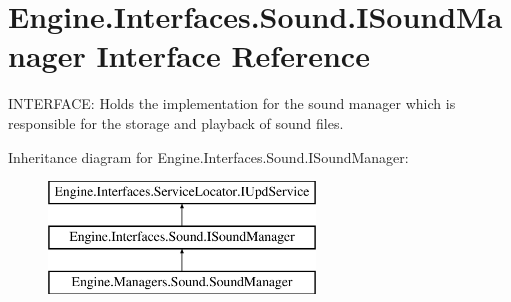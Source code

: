 \hypertarget{a00482}{}\section{Engine.\+Interfaces.\+Sound.\+I\+Sound\+Manager Interface Reference}
\label{a00482}


I\+N\+T\+E\+R\+F\+A\+CE\+: Holds the implementation for the sound manager which is responsible for the storage and playback of sound files.  


Inheritance diagram for Engine.\+Interfaces.\+Sound.\+I\+Sound\+Manager\+:\begin{figure}[H]
\begin{center}
\leavevmode
\includegraphics[height=3.000000cm]{db/d8e/a00482}
\end{center}
\end{figure}
